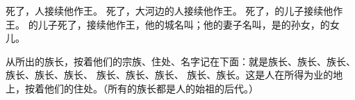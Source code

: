 {死了，{}人{}接续他作王。
死了，大河边的{}人{}接续他作王。
死了，{}的儿子{}接续他作王。
的儿子{}死了，{}接续他作王，他的{}城名叫{}；他的妻子名叫{}，是{}的孙女，{}的女儿。
\par }{\PP {}从{}所出的族长，按着他们的宗族、住处、名字记在下面：就是{}族长、{}族长、{}族长、
族长、{}族长、{}族长、
族长、{}族长、{}族长、
族长、{}族长。这是{}人在所得为业的地上，按着他们的住处。（所有的族长都是{}人的始祖{}的后代。）

}
